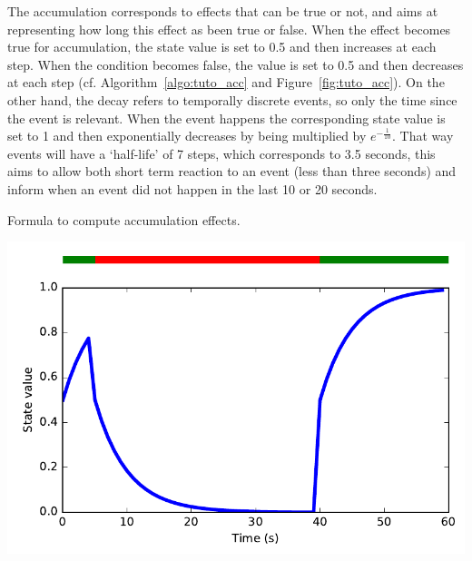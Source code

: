 The accumulation corresponds to effects that can be true or not, and aims at representing how long this effect as been true or false. When the effect becomes true for accumulation, the state value is set to 0.5 and then increases at each step. When the condition becomes false, the value is set to 0.5 and then decreases at each step (cf. Algorithm~\ref{algo:tuto_acc} and Figure~\ref{fig:tuto_acc}). On the other hand, the decay refers to temporally discrete events, so only the time since the event is relevant. When the event happens the corresponding state value is set to 1 and then exponentially decreases by being multiplied by $e^{-\frac{1}{10}}$. That way events will have a `half-life' of 7 steps, which corresponds to 3.5 seconds, this aims to allow both short term reaction to an event (less than three seconds) and inform when an event did not happen in the last 10 or 20 seconds.


\begin{minipage}[t]{0.53\textwidth}
\begin{algorithm}[H]
	\caption{Formula to compute accumulation effects.}
	\label{algo:tuto_acc}
\end{algorithm}
\end{minipage}
\begin{minipage}[t]{0.47\textwidth}
		\centering
		\vspace{.1cm}
		\includegraphics[width=1\textwidth]{accumulation.pdf}
		\label{fig:tuto_acc}
\end{minipage}

